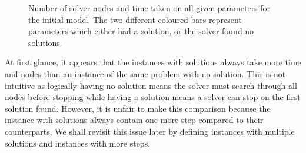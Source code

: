 \documentclass{article}
\begin{document}
\begin{figure}[H]
\caption{Number of solver nodes and time taken on all given parameters for the initial model. The two different coloured bars represent parameters which either had a solution, or the solver found no solutions.}
\end{figure}
\noindent
At first glance, it appears that the instances with solutions always take more time and nodes than an instance of the same problem with no solution. This is not intuitive as logically having no solution means the solver must search through all nodes before stopping while having a solution means a solver can stop on the first solution found. However, it is unfair to make this comparison because the instance with solutions always contain one more step compared to their counterparts. We shall revisit this issue later by defining instances with multiple solutions and instances with more steps. 
\end{document}
